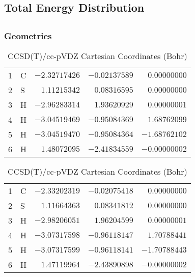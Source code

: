 \documentclass[10pt,oneside]{article}
\begin{document}
\begin{table}
\subsection*{Total Energy Distribution}
\centering\end{table}

\clearpage

\subsection{}

\begin{table}[h!]
\subsubsection*{Geometries}
\begin{multicols}{2}
\centering
\caption{CCSD(T)/cc-pVTZ Cartesian Coordinates (Bohr)}
\begin{tabular}{llrrr}
\toprule
1  & C  & $-2.32717426$ & $-0.02137589$ & $ 0.00000000$ \\
2  & S  & $ 1.11215342$ & $ 0.08316595$ & $ 0.00000000$ \\
3  & H  & $-2.96283314$ & $ 1.93620929$ & $ 0.00000001$ \\
4  & H  & $-3.04519469$ & $-0.95084369$ & $ 1.68762099$ \\
5  & H  & $-3.04519470$ & $-0.95084364$ & $-1.68762102$ \\
6  & H  & $ 1.48072095$ & $-2.41834559$ & $-0.00000002$ \\
\bottomrule
\end{tabular}
\caption{CCSD(T)/cc-pVDZ Cartesian Coordinates (Bohr)}
\begin{tabular}{llrrr}
\toprule
1  & C  & $-2.33202319$ & $-0.02075418$ & $ 0.00000000$ \\
2  & S  & $ 1.11664363$ & $ 0.08341812$ & $ 0.00000000$ \\
3  & H  & $-2.98206051$ & $ 1.96204599$ & $ 0.00000001$ \\
4  & H  & $-3.07317598$ & $-0.96118147$ & $ 1.70788441$ \\
5  & H  & $-3.07317599$ & $-0.96118141$ & $-1.70788443$ \\
6  & H  & $ 1.47119964$ & $-2.43890898$ & $-0.00000002$ \\
\bottomrule
\end{tabular}
\end{multicols}
\end{table}
\end{document}

